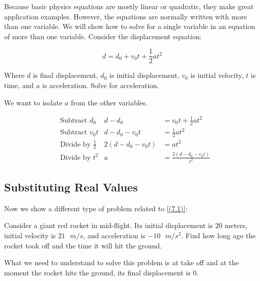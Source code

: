 \documentclass{book}
\theoremstyle{definition}
\begin{document}
Because basic physics equations are mostly linear or quadratic, they make great application examples. However, the equations are normally written with more than one variable. We will show how to solve for a single variable in an equation of more than one variable. Consider the displacement equation:

\begin{equation}
\label{(7.1)}
d=d_0+v_0t+\frac{1}{2}at^2
\end{equation}

Where $d$ is final displacement, $d_0$ is initial displacement, $v_0$ is initial velocity, $t$ is time, and $a$ is acceleration. Solve for acceleration.

We want to isolate $a$ from the other variables.

\begin{align*}\label{(7.2)}
&\text{Subtract }d_0  &d-d_0&=v_0t+\frac{1}{2}at^2 \\
&\text{Subtract }v_0t
&d-d_0-v_0t&=\frac{1}{2}at^2 \\
&\text{Divide by }\frac{1}{2}  &2(d-d_0-v_0t)&=at^2 \\
&\text{Divide by }t^2
&a&=\frac{2(d-d_0-v_0t)}{t^2} 
\end{align*}

\subsection{Substituting Real Values}

Now we show a different type of problem related to \ref{(7.1)}:

\begin{center}

Consider a giant red rocket in mid-flight. Its initial displacement is $20$ meters, initial velocity is $21\text{ }m/s$, and acceleration is $-10\text{ }m/s^2$. Find how long ago the rocket took off and the time it will hit the ground.

\end{center}

What we need to understand to solve this problem is at take off and at the moment the rocket hits the ground, its final displacement is 0. 
\end{document}
